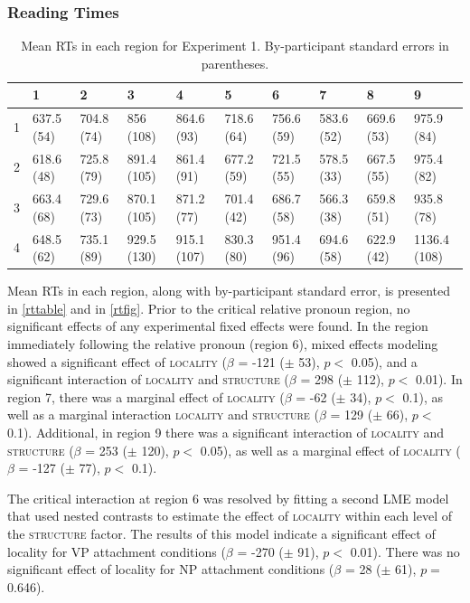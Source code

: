 \documentclass[12pt]{article}
\begin{document}
\subsubsection{Reading Times}
\label{sec:rts}

\begin{table}[ht]
\begin{center}
{\scriptsize
\begin{tabularx}{\textwidth}{rlllllllll}
  \hline
 & 1 & 2 & 3 & 4 & 5 & 6 & 7 & 8 & 9 \\ 
  \hline
1 & 637.5 (54) & 704.8 (74) & 856 (108) & 864.6 (93) & 718.6 (64) & 756.6 (59) & 583.6 (52) & 669.6 (53) & 975.9 (84) \\ 
  2 & 618.6 (48) & 725.8 (79) & 891.4 (105) & 861.4 (91) & 677.2 (59) & 721.5 (55) & 578.5 (33) & 667.5 (55) & 975.4 (82) \\ 
  3 & 663.4 (68) & 729.6 (73) & 870.1 (105) & 871.2 (77) & 701.4 (42) & 686.7 (58) & 566.3 (38) & 659.8 (51) & 935.8 (78) \\ 
  4 & 648.5 (62) & 735.1 (89) & 929.5 (130) & 915.1 (107) & 830.3 (80) & 951.4 (96) & 694.6 (58) & 622.9 (42) & 1136.4 (108) \\ 
   \hline
\end{tabularx}
}
\caption{Mean RTs in each region for Experiment 1. By-participant standard errors in parentheses.}
\end{center}
\end{table}
Mean RTs in each region, along with by-participant standard error, is presented in \ref{rttable} and in \ref{rtfig}. Prior to the critical relative pronoun region, no significant effects of any experimental fixed effects were found. In the region immediately following the relative pronoun (region 6), mixed effects modeling showed a significant effect of \textsc{locality} ($\beta$ = -121 ($\pm$ 53), $p <$ 0.05), and a significant interaction of \textsc{locality} and \textsc{structure} ($\beta$ = 298 ($\pm$ 112), $p <$ 0.01). In region 7, there was a marginal effect of \textsc{locality} ($\beta$ = -62 ($\pm$ 34), $p <$ 0.1), as well as a marginal interaction \textsc{locality} and \textsc{structure} ($\beta$ = 129 ($\pm$ 66), $p <$ 0.1). Additional, in region 9 there was a significant interaction of \textsc{locality} and \textsc{structure} ($\beta$ = 253 ($\pm$ 120), $p <$ 0.05), as well as a marginal effect of \textsc{locality} ($\beta$ = -127 ($\pm$ 77), $p <$ 0.1).

The critical interaction at region 6 was resolved by fitting a second LME model that used nested contrasts to estimate the effect of \textsc{locality} within each level of the \textsc{structure} factor. The results of this model indicate a significant effect of locality for VP attachment conditions ($\beta$ = -270 ($\pm$ 91), $p <$ 0.01). There was no significant effect of locality for NP attachment conditions ($\beta$ = 28 ($\pm$ 61), $p =$ 0.646).
\end{document}
